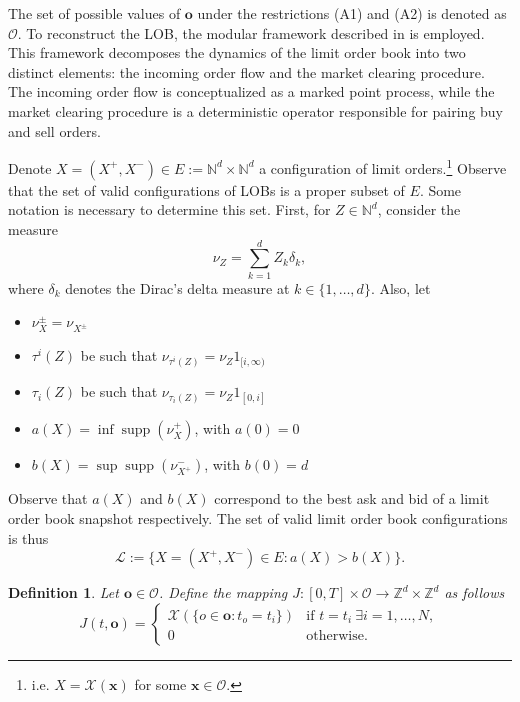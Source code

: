 \documentclass[10pt,a4paper,oneside]{article}
\newcommand{\N}{\mathbb{N}}
\newcommand{\Z}{\mathbb{Z}}
\newcommand{\Bo}{\mathcal{L}}
\newtheorem{definition}{Definition}
\DeclareMathOperator{\support}{supp}
\begin{document}
The set of possible values of $\mathbf{o}$ under the restrictions (A1) and (A2) is denoted as $\mathcal{O}$. To reconstruct the LOB, the modular framework described in \cite{cont2023mathematical} is employed. This framework decomposes the dynamics of the limit order book into two distinct elements: the incoming order flow and the market clearing procedure. The incoming order flow is conceptualized as a marked point process, while the market clearing procedure is a deterministic operator responsible for pairing buy and sell orders.


Denote $X = (X^+, X^-) \in E := \N^d \times \N^d$ a configuration of limit orders.\footnote{i.e. $X = \mathcal{X}(\mathbf{x})$ for some $\mathbf{x} \in \mathcal{O}$.}  Observe that the set of valid configurations of LOBs is a proper subset of $E$. Some notation is necessary to determine this set. First, for $Z \in \N^d$, consider the measure 
$$
\nu_Z = \sum^d_{k = 1}Z_k \delta_k,
$$
where $\delta_k$ denotes the Dirac's delta measure at $k \in \{1, \dots, d \}$. Also, let
\begin{itemize}
    \item $\nu^{\pm}_X = \nu_{X^{\pm}}$
    \item $\tau^i(Z)$ be such that $\nu_{\tau^i(Z)} = \nu_Z 1_{[i, \infty)}$
    \item $\tau_i(Z)$ be such that $\nu_{\tau_i(Z)} = \nu_Z 1_{[0, i]}$
    \item $a(X) = \inf \support(\nu^+_{X})$, with $a(0) = 0$
    \item $b(X) = \sup \support(\nu^-_{X^+})$, with $b(0) = d$
\end{itemize}

Observe that $a(X)$ and $b(X)$ correspond to the best ask and bid of a limit order book snapshot respectively. The set of valid limit order book configurations is thus
$$
\Bo := \{X = (X^+, X^-) \in E : a(X) > b(X)\}.
$$

\begin{definition}
    Let $\mathbf{o} \in \mathcal{O}$. Define the mapping $J : [0, T] \times \mathcal{O} \rightarrow \Z^d \times \Z^d$ as follows
    \begin{equation*}
    J(t, \mathbf{o}) = \begin{cases}
        \mathcal{X}(\{ o \in \mathbf{o} : t_o = t_i  \}) & \text{if } t = t_{i} \ \exists  i = 1, \dots, N,\\
        0                        & \text{otherwise.}
    \end{cases}
\end{equation*}
\end{definition}
\end{document}
